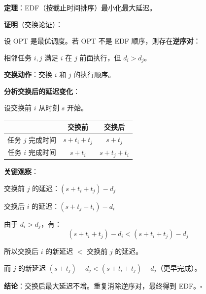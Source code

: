 \documentclass[12pt, a4paper]{ctexart}
\begin{document}
\begin{blackboard}

\textbf{定理}：EDF（按截止时间排序）最小化最大延迟。

\textbf{证明}（交换论证）：

设 OPT 是最优调度。若 OPT 不是 EDF 顺序，则存在\textbf{逆序对}：

相邻任务 $i, j$ 满足 $i$ 在 $j$ 前面执行，但 $d_i > d_j$。

\textbf{交换动作}：交换 $i$ 和 $j$ 的执行顺序。

\textbf{分析交换后的延迟变化}：

设交换前 $i$ 从时刻 $s$ 开始。

\begin{center}
\begin{tabular}{c|cc}
 & 交换前 & 交换后 \\
\hline
任务 $j$ 完成时间 & $s + t_i + t_j$ & $s + t_j$ \\
任务 $i$ 完成时间 & $s + t_i$ & $s + t_j + t_i$ \\
\end{tabular}
\end{center}

\textbf{关键观察}：

交换前 $j$ 的延迟：$(s + t_i + t_j) - d_j$

交换后 $i$ 的延迟：$(s + t_j + t_i) - d_i$

由于 $d_i > d_j$，有：
\[
(s + t_i + t_j) - d_i < (s + t_i + t_j) - d_j
\]

所以交换后 $i$ 的新延迟 $<$ 交换前 $j$ 的延迟。

而 $j$ 的新延迟 $(s + t_j) - d_j < (s + t_i + t_j) - d_j$（更早完成）。

\textbf{结论}：交换后最大延迟不增。重复消除逆序对，最终得到 EDF。$\square$

\end{blackboard}
\end{document}
